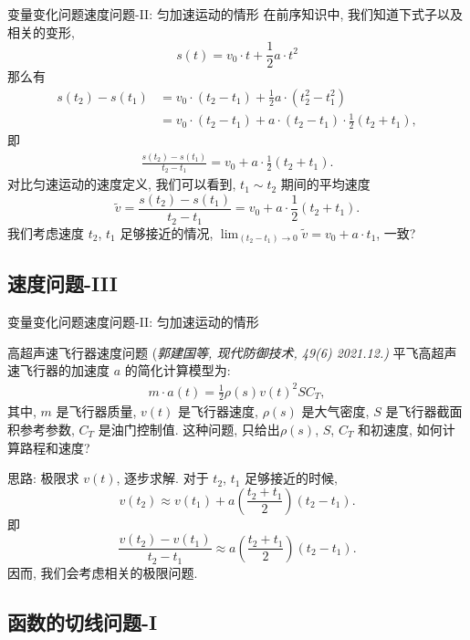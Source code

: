 \documentclass[
10pt,
aspectratio=43,
]{beamer}
\begin{document}
\begin{frame}{变量变化问题}{速度问题-II: 匀加速运动的情形}
	在前序知识中, 我们知道下式子以及相关的变形,
	\[
		s(t) = v_0\cdot t+ \frac{1}{2}a\cdot t^2
	\]
	那么有
	\begin{align*}
		s(t_2) - s(t_1) & = v_0\cdot (t_2-t_1)+ \frac{1}{2}a\cdot (t_2^2-t_1^2)            \\
		                & =v_0\cdot(t_2-t_1) + a\cdot(t_2-t_1) \cdot \frac{1}{2}(t_2+t_1),
	\end{align*}
	即
	\begin{align*}
		\frac{s(t_2) - s(t_1)}{t_2-t_1} = v_0 + a\cdot \frac{1}{2}(t_2+t_1).
	\end{align*}
	对比匀速运动的速度定义, 我们可以看到, $t_1\sim t_2$ 期间的平均速度
	\begin{equation*}
		\tilde{v}=\frac{s(t_2) - s(t_1)}{t_2-t_1} = v_0 + a\cdot \frac{1}{2}(t_2+t_1).
	\end{equation*}
	我们考虑速度 $t_2$, $t_1$ 足够接近的情况, $\lim_{(t_2-t_1)\to 0}\tilde{v}=v_0+a\cdot t_1$, 一致?
\end{frame}

\subsection{速度问题-III} %
\begin{frame}{变量变化问题}{速度问题-II: 匀加速运动的情形}
	\begin{exampleblock}{高超声速飞行器速度问题 \color{blue}(\small{\it 郭建国等, {现代防御技术}, 49(6) 2021.12.)}}
		平飞高超声速飞行器的加速度 $a$ 的简化计算模型为:
		\begin{align*}
			m\cdot a(t)= \frac{1}{2}\rho(s) v(t)^2 S C_T,
		\end{align*}
		其中, $m$ 是飞行器质量, $v(t)$ 是飞行器速度, $\rho(s)$ 是大气密度, $S$ 是飞行器截面积参考参数, $C_T$ 是油门控制值. 这种问题, 只给出$\rho(s)$, $S$, $C_T$ 和初速度, 如何计算路程和速度?
	\end{exampleblock}
	思路: 极限求 $v(t)$, 逐步求解. 对于 $t_2$, $t_1$ 足够接近的时候,
	\[
		v(t_2)\approx v(t_1)+a\left(\frac{t_2+t_1}{2}\right)(t_2-t_1).
	\]
	即
	\[
		\frac{v(t_2)-v(t_1)}{t_2-t_1}\approx a\left(\frac{t_2+t_1}{2}\right)(t_2-t_1).
	\]
	因而, 我们会考虑相关的极限问题.
\end{frame}

\subsection{函数的切线问题-I} %
\end{document}
